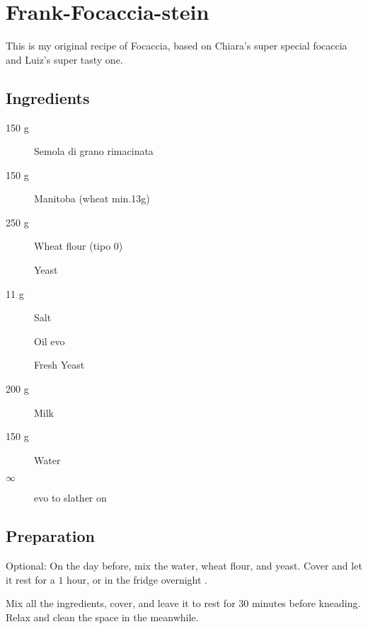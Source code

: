 \setchapterpreamble[u]{\margintoc}
\chapter{Frank-Focaccia-stein}

This is my original recipe of Focaccia, based on Chiara's super special focaccia and Luiz's super tasty one.

\section{Ingredients}

\begin{multicols}{2}
\begin{description}
	\item[150 g] Semola di grano rimacinata
	\item[150 g] Manitoba (wheat min.13g)
	\item[250 g] Wheat flour (tipo 0)
	
	\item[] Yeast
	\item[11 g] Salt
	
	\item[] Oil \gls{evo}
	\item[] Fresh Yeast
	
	\item[200 g] Milk
	\item[150 g] Water
	\item[$\infty$] \gls{evo} to slather on
\end{description}
\end{multicols}	

\section{Preparation}
Optional:
On the day before, mix the water, wheat flour, and yeast.
Cover and let it rest for a $1$ hour, or in the fridge overnight .

Mix all the ingredients, cover, and leave it to rest for $30$ minutes before kneading.
%
Relax and clean the space in the meanwhile.

